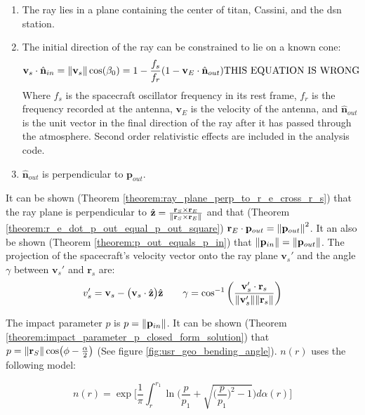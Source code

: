 \documentclass{article}
\theoremstyle{mystyle}
\begin{document}
\begin{enumerate}[itemsep=0pt]
\item The ray lies in a plane containing the center of \gls{titan}, Cassini, and the \gls{dsn} station. 
\item The initial direction of the ray can be constrained to lie on a known cone:
\begin{equation}
\mathbf{v}_{s}\cdot \hat{\mathbf{n}}_{in} = \norm{\mathbf{v}_{s}}\cos(\beta_0) = 1-\frac{f_s}{f_r}(1-\mathbf{v}_{E}\cdot \hat{\mathbf{n}}_{out})\textrm{THIS EQUATION IS WRONG}
\end{equation}
Where $f_s$ is the spacecraft oscillator frequency in its rest frame, $f_r$ is the frequency recorded at the antenna, $\mathbf{v}_{E}$ is the velocity of the antenna, and $\hat{\mathbf{n}}_{out}$ is the unit vector in the final direction of the ray after it has passed through the atmosphere. Second order relativistic effects are included in the analysis code.
\item $\hat{\mathbf{n}}_{out}$ is perpendicular to $\mathbf{p}_{out}$.
\end{enumerate}

It can be shown (Theorem \ref{theorem:ray_plane_perp_to_r_e_cross_r_s}) that the ray plane is perpendicular to $\hat{\mathbf{z}} = \frac{\mathbf{r}_{S}\times \mathbf{r}_{E}}{\norm{\mathbf{r}_{S}\times \mathbf{r}_{E}}}$ and that (Theorem \ref{theorem:r_e_dot_p_out_equal_p_out_square}) $\mathbf{r}_{E}\cdot \mathbf{p}_{out} = \norm{\mathbf{p}_{out}}^2$. It an also be shown (Theorem \ref{theorem:p_out_equals_p_in}) that $\norm{\mathbf{p}_{in}}=\norm{\mathbf{p}_{out}}$. The projection of the spacecraft's velocity vector onto the ray plane $\mathbf{v}_{s}'$ and the angle $\gamma$ between $\mathbf{v}_{s}'$ and $\mathbf{r}_{s}$ are:
\begin{equation}
v_{s}' = \mathbf{v}_{s} - \big(\mathbf{v}_{s}\cdot \hat{\mathbf{z}}\big) \hat{\mathbf{z}}\quad \quad \gamma = \cos^{-1}\bigg(\frac{\mathbf{v}_{s}'\cdot \mathbf{r}_{s}}{\norm{\mathbf{v}_{s}'} \norm{\mathbf{r}_{s}}}\bigg)
\end{equation}

\noindent The impact parameter $p$ is $p=\norm{\mathbf{p}_{in}}$. It can be shown (Theorem \ref{theorem:impact_parameter_p_closed_form_solution}) that $p = \norm{\mathbf{r}_{S}}\cos(\phi - \frac{\alpha}{2})$ (See figure \ref{fig:usr_geo_bending_angle}). $n(r)$ uses the following model:

\begin{equation}
n(r) = \exp\bigg[\frac{1}{\pi}\int_{r}^{r_1}\ln\bigg(\frac{p}{p_1}+\sqrt{\big(\frac{p}{p_1}\big)^2 - 1}\bigg)d\alpha(r)\bigg]
\end{equation}
\end{document}
